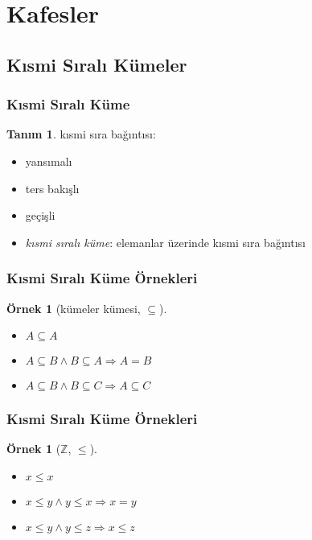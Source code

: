 \documentclass[dvipsnames]{beamer}
\theoremstyle{definition}
\newtheorem{tanim}[theorem]{Tanım}
\theoremstyle{example}
\newtheorem{ornek}[theorem]{Örnek}
\theoremstyle{plain}
\begin{document}
\section{Kafesler}

\subsection{Kısmi Sıralı Kümeler}

\begin{frame}
  \frametitle{Kısmi Sıralı Küme}

  \begin{tanim}
    \alert{kısmi sıra bağıntısı}:
    \begin{itemize}
      \item yansımalı
      \item ters bakışlı
      \item geçişli
    \end{itemize}
  \end{tanim}

  \pause
  \begin{itemize}
    \item \emph{kısmi sıralı küme}: elemanlar üzerinde kısmi sıra bağıntısı
  \end{itemize}
\end{frame}

\begin{frame}
  \frametitle{Kısmi Sıralı Küme Örnekleri}

  \begin{ornek}[kümeler kümesi, $\subseteq$]
    \begin{itemize}
      \item $A \subseteq A$
      \item $A \subseteq B \wedge B \subseteq A \Rightarrow A = B$
      \item $A \subseteq B \wedge B \subseteq C \Rightarrow A \subseteq C$
    \end{itemize}
  \end{ornek}
\end{frame}

\begin{frame}
  \frametitle{Kısmi Sıralı Küme Örnekleri}

  \begin{ornek}[$\mathbb{Z}$, $\leq$]
    \begin{itemize}
      \item $x \leq x$
      \item $x \leq y \wedge y \leq x \Rightarrow x = y$
      \item $x \leq y \wedge y \leq z \Rightarrow x \leq z$
    \end{itemize}
  \end{ornek}
\end{frame}
\end{document}
